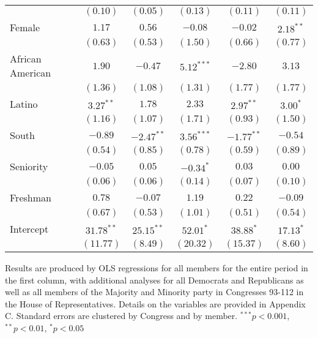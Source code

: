 \documentclass[12pt]{article}
\begin{document}
\begin{table}[H]
\begin{threeparttable}
\begin{tabular}{l c c c c c }
                      & $(0.10)$     & $(0.05)$     & $(0.13)$     & $(0.11)$      & $(0.11)$     \\
Female                & $1.17$       & $0.56$       & $-0.08$      & $-0.02$       & $2.18^{**}$  \\
                      & $(0.63)$     & $(0.53)$     & $(1.50)$     & $(0.66)$      & $(0.77)$     \\
African American      & $1.90$       & $-0.47$      & $5.12^{***}$ & $-2.80$       & $3.13$       \\
                      & $(1.36)$     & $(1.08)$     & $(1.31)$     & $(1.77)$      & $(1.77)$     \\
Latino                & $3.27^{**}$  & $1.78$       & $2.33$       & $2.97^{**}$   & $3.00^{*}$   \\
                      & $(1.16)$     & $(1.07)$     & $(1.71)$     & $(0.93)$      & $(1.50)$     \\
South                 & $-0.89$      & $-2.47^{**}$ & $3.56^{***}$ & $-1.77^{**}$  & $-0.54$      \\
                      & $(0.54)$     & $(0.85)$     & $(0.78)$     & $(0.59)$      & $(0.89)$     \\
Seniority             & $-0.05$      & $0.05$       & $-0.34^{*}$  & $0.03$        & $0.00$       \\
                      & $(0.06)$     & $(0.06)$     & $(0.14)$     & $(0.07)$      & $(0.10)$     \\
Freshman              & $0.78$       & $-0.07$      & $1.19$       & $0.22$        & $-0.09$      \\
                      & $(0.67)$     & $(0.53)$     & $(1.01)$     & $(0.51)$      & $(0.54)$     \\
Intercept             & $31.78^{**}$ & $25.15^{**}$ & $52.01^{*}$  & $38.88^{*}$   & $17.13^{*}$  \\
                      & $(11.77)$    & $(8.49)$     & $(20.32)$    & $(15.37)$     & $(8.60)$     \\
\hline
\end{tabular}
\begin{tablenotes}
   \item
   Results are produced by OLS regressions for all members for the entire period in the first column, with additional analyses for all Democrats and Republicans as well as all members of the Majority and Minority party in Congresses 93-112 in the House of Representatives. Details on the variables are provided in Appendix C.
   Standard errors are clustered by Congress and by member.
$^{***}p<0.001$, $^{**}p<0.01$, $^*p<0.05$
 \end{tablenotes}
\end{threeparttable}
\end{table}
\end{document}
